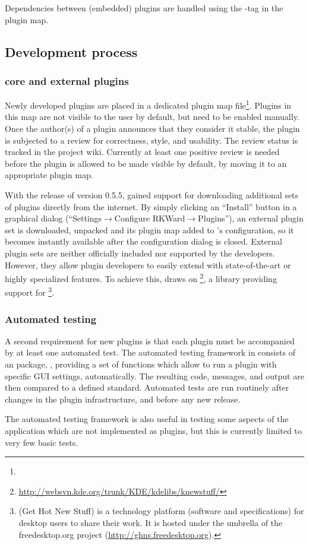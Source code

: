 Dependencies between (embedded) plugins are handled using the -tag in the plugin map.

\subsection{Development process}
\subsubsection[RKWard core and external plugins]{ core and external plugins}
\label{sec:technical_processes_plugins}
Newly developed plugins are placed in a dedicated plugin map file\footnote{
}. Plugins in this map are not visible to the user by default, but need to be enabled manually. Once the
author(s) of a plugin announces that they consider it stable, the plugin is subjected to a review for
correctness, style, and usability. The review status is tracked in the project wiki. Currently at least one
positive review is needed before the plugin is allowed to be made visible by default, by moving it to an
appropriate plugin map.

With the release of version 0.5.5,  gained support for downloading additional sets
of plugins directly from the internet. By simply clicking an ``Install'' button in a graphical dialog 
(``Settings$\rightarrow$Configure RKWard$\rightarrow$Plugins''), an
external plugin set is downloaded, unpacked and its plugin map added to 's configuration, so
it becomes instantly available after the configuration dialog is closed. External plugin sets are
neither officially included nor supported by the  developers. However, they allow plugin
developers to easily extend  with state-of-the-art or highly specialized features. To
achieve this,  draws on \footnote{
  \url{http://websvn.kde.org/trunk/KDE/kdelibs/knewstuff/}
}, a  library providing support for \footnote{
 (Get Hot New Stuff) is a technology platform (software and specifications) for desktop users to share their work. It is hosted
under the umbrella of the freedesktop.org project (\url{http://ghns.freedesktop.org}).}.

\subsubsection{Automated testing}
\label{sec:technical_processes_automatedtesting}
A second requirement for new plugins is that each plugin must be accompanied by
at least one automated test. The automated testing framework in  consists
of an  package, , providing a set of  functions which allow to run a
plugin with specific GUI settings, automatically. The resulting  code,  messages, and
output are then compared to a defined standard. Automated tests are run routinely after changes in the
plugin infrastructure, and before any new release.

The automated testing framework is also useful in testing some aspects of the
application which are not implemented as plugins, but this is currently limited
to very few basic tests.
